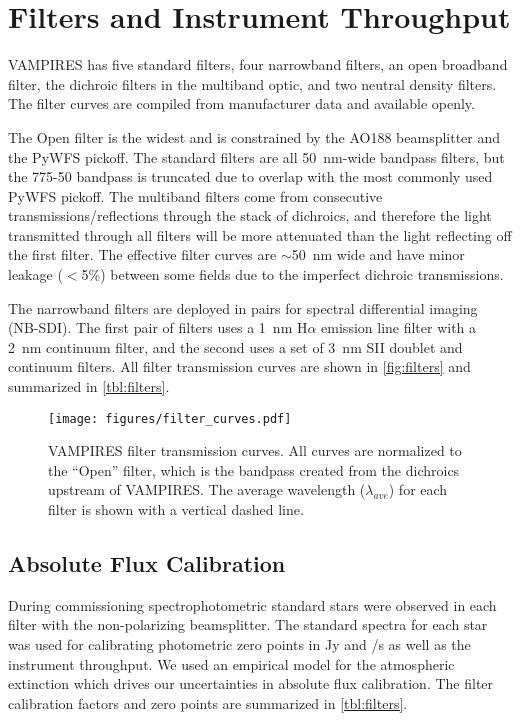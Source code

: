 \section{Filters and Instrument Throughput}\label{sec:filters}

VAMPIRES has five standard filters, four narrowband filters, an open broadband filter, the dichroic filters in the multiband optic, and two neutral density filters. The filter curves are compiled from manufacturer data and available openly. 

The Open filter is the widest and is constrained by the AO188 beamsplitter and the PyWFS pickoff. The standard filters are all \SI{50}{\nm}-wide bandpass filters, but the 775-50 bandpass is truncated due to overlap with the most commonly used PyWFS pickoff. The multiband filters come from consecutive transmissions/reflections through the stack of dichroics, and therefore the light transmitted through all filters will be more attenuated than the light reflecting off the first filter. The effective filter curves are $\sim$\SI{50}{\nm} wide and have minor leakage ($<$5\%) between some fields due to the imperfect dichroic transmissions.

The narrowband filters are deployed in pairs for spectral differential imaging (NB-SDI). The first pair of filters uses a \SI{1}{\nm} H$\alpha$ emission line filter with a \SI{2}{\nm} continuum filter, and the second uses a set of \SI{3}{\nm} SII doublet and continuum filters. All filter transmission curves are shown in \autoref{fig:filters} and summarized in \autoref{tbl:filters}.

\begin{figure}
    \centering
    \texttt{[image: figures/filter\_curves.pdf]}
    \caption{VAMPIRES filter transmission curves. All curves are normalized to the ``Open'' filter, which is the bandpass created from the dichroics upstream of VAMPIRES. The average wavelength ($\lambda_{ave}$) for each filter is shown with a vertical dashed line.\label{fig:filters}}
\end{figure}

\subsection{Absolute Flux Calibration}

During commissioning spectrophotometric standard stars were observed in each filter with the non-polarizing beamsplitter. The standard spectra for each star was used for calibrating photometric zero points in \si{Jy} and \si{\electron/\second} as well as the instrument throughput. We used an empirical model for the atmospheric extinction \citep{buton_atmospheric_2013} which drives our uncertainties in absolute flux calibration. The filter calibration factors and zero points are summarized in \autoref{tbl:filters}.

